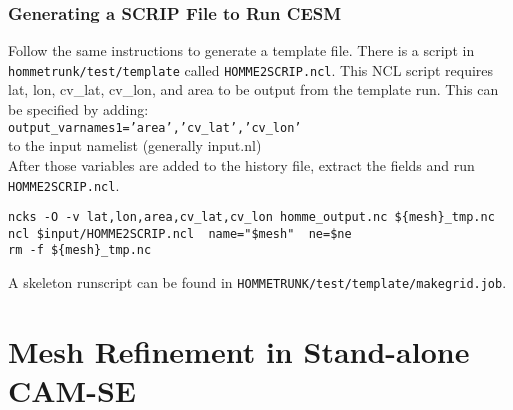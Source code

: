 \documentclass{beamer}
\begin{document}
%
\hypertarget{scrip}{}
\begin{frame}[containsverbatim]
\frametitle{Generating a SCRIP File to Run CESM}
\begin{block}{}

Follow the same instructions to generate a template file. There is a script in \texttt{hommetrunk/test/template} called \texttt{HOMME2SCRIP.ncl}. This NCL script requires lat, lon, cv\_lat, cv\_lon, and area to be output from the template run. This can be specified by adding: \\

\texttt{output\_varnames1='area','cv\_lat','cv\_lon'} \\

to the input namelist (generally input.nl) \\

After those variables are added to the history file, extract the fields and run \texttt{HOMME2SCRIP.ncl}.

\begin{verbatim}
ncks -O -v lat,lon,area,cv_lat,cv_lon homme_output.nc ${mesh}_tmp.nc
ncl $input/HOMME2SCRIP.ncl  name="$mesh"  ne=$ne
rm -f ${mesh}_tmp.nc
\end{verbatim}

A skeleton runscript can be found in \texttt{HOMMETRUNK/test/template/makegrid.job}.

\end{block}
\end{frame}
%
\section{Mesh Refinement in Stand-alone CAM-SE}
\end{document}
